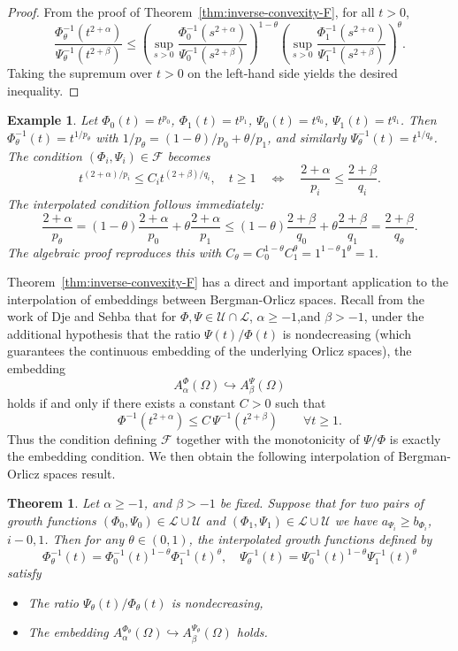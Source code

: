 \documentclass[12pt]{amsart}
\newtheorem{theorem}{Theorem}
\newtheorem{example}{Example}
\newcommand{\U}{\mathcal{U}}
\newcommand{\Lc}{\mathcal{L}}
\begin{document}
\begin{proof}
From the proof of Theorem~\ref{thm:inverse-convexity-F}, for all $t>0$,
\[
\frac{\Phi_\theta^{-1}(t^{2+\alpha})}{\Psi_\theta^{-1}(t^{2+\beta})}
\le \left( \sup_{s>0} \frac{\Phi_0^{-1}(s^{2+\alpha})}{\Psi_0^{-1}(s^{2+\beta})} \right)^{1-\theta}
\left( \sup_{s>0} \frac{\Phi_1^{-1}(s^{2+\alpha})}{\Psi_1^{-1}(s^{2+\beta})} \right)^{\theta}.
\]
Taking the supremum over $t>0$ on the left-hand side yields the desired inequality.
\end{proof}

\begin{example}
Let $\Phi_0(t)=t^{p_0}$, $\Phi_1(t)=t^{p_1}$, $\Psi_0(t)=t^{q_0}$, $\Psi_1(t)=t^{q_1}$.
Then $\Phi_\theta^{-1}(t)=t^{1/p_\theta}$ with $1/p_\theta = (1-\theta)/p_0 + \theta/p_1$,
and similarly $\Psi_\theta^{-1}(t)=t^{1/q_\theta}$.
The condition $(\Phi_i,\Psi_i) \in \mathcal{F}$ becomes
\[
t^{(2+\alpha)/p_i} \le C_i t^{(2+\beta)/q_i},\quad t\ge 1 \quad \Longleftrightarrow \quad
\frac{2+\alpha}{p_i} \le \frac{2+\beta}{q_i}.
\]
The interpolated condition follows immediately:
\[
\frac{2+\alpha}{p_\theta} = (1-\theta)\frac{2+\alpha}{p_0} + \theta\frac{2+\alpha}{p_1}
\le (1-\theta)\frac{2+\beta}{q_0} + \theta\frac{2+\beta}{q_1}
= \frac{2+\beta}{q_\theta}.
\]
The algebraic proof reproduces this with $C_\theta = C_0^{1-\theta}C_1^{\theta}=1^{1-\theta}1^\theta=1$.
\end{example}

\medskip
Theorem~\ref{thm:inverse-convexity-F} has a direct and important application to the interpolation of embeddings between Bergman-Orlicz spaces. Recall from the work of Dje and Sehba \cite{DieSehba2021,DieSehba2023,Sehba} that for $\Phi, \Psi \in \U\cap \Lc$, $\alpha\ge -1$,and $\beta > -1$, under the additional hypothesis that the ratio $\Psi(t)/\Phi(t)$ is nondecreasing (which guarantees the continuous embedding of the underlying Orlicz spaces), the embedding
\[
A^{\Phi}_{\alpha}(\Omega) \hookrightarrow A^{\Psi}_{\beta}(\Omega)
\]
holds if and only if there exists a constant $C>0$ such that
\[
\Phi^{-1}(t^{2+\alpha}) \le C \, \Psi^{-1}(t^{2+\beta}) \qquad \forall t\ge 1.
\]
Thus the condition defining $\mathcal{F}$ together with the monotonicity of $\Psi/\Phi$ is exactly the embedding condition. 
We then obtain the following interpolation of Bergman-Orlicz spaces result.
\begin{theorem}\label{thm:interpolation}
Let $\alpha\ge -1$, and $\beta > -1$ be fixed. Suppose that for two pairs of growth functions $(\Phi_0,\Psi_0)\in \Lc\cup\U$ and $(\Phi_1,\Psi_1)\in\Lc\cup\U$ we have $a_{\Psi_i}\ge b_{\Phi_i}$, $i-0,1$.
Then for any $\theta \in (0,1)$, the interpolated growth functions defined by
\[
\Phi_\theta^{-1}(t) = \Phi_0^{-1}(t)^{1-\theta} \Phi_1^{-1}(t)^{\theta}, \quad
\Psi_\theta^{-1}(t) = \Psi_0^{-1}(t)^{1-\theta} \Psi_1^{-1}(t)^{\theta}
\]
satisfy
\begin{itemize}
\item The ratio $\Psi_\theta(t)/\Phi_\theta(t)$ is nondecreasing,
\item The embedding $A^{\Phi_\theta}_{\alpha}(\Omega) \hookrightarrow A^{\Psi_\theta}_{\beta}(\Omega)$ holds.
\end{itemize}
\end{theorem}
\end{document}

